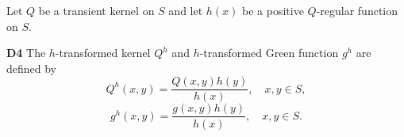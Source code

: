 Let $Q$ be a transient kernel on $S$ and let $h(x)$ be a positive $Q$-regular function on $S$.

\textbf{D4} The $h$-transformed kernel $Q^h$ and $h$-transformed Green function $g^h$ are defined by
$$Q^h(x,y) = \frac{Q(x,y)h(y)}{h(x)}, \quad x,y \in S,$$
$$g^h(x,y) = \frac{g(x,y)h(y)}{h(x)}, \quad x,y \in S.$$
